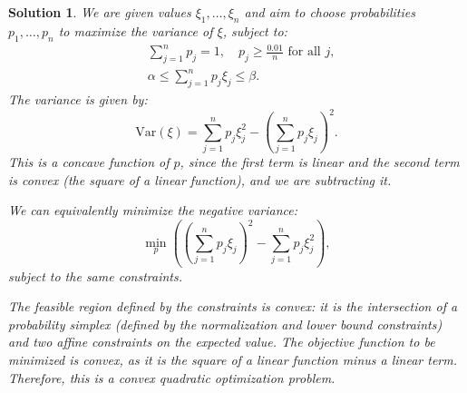 \documentclass[11pt]{article}
\theoremstyle{mystyle}
\newtheorem*{solution}{Solution}
\begin{document}
\begin{solution}
        We are given values \(\xi_1, \ldots, \xi_n\) and aim to choose probabilities \(p_1, \ldots, p_n\) to maximize the variance of \(\xi\), subject to:
        \begin{align*}
        & \sum_{j=1}^n p_j = 1, \quad p_j \geq \frac{0.01}{n} \text{ for all } j, \\
        & \alpha \leq \sum_{j=1}^n p_j \xi_j \leq \beta.
        \end{align*}
        The variance is given by:
        \[
        \text{Var}(\xi) = \sum_{j=1}^n p_j \xi_j^2 - \left( \sum_{j=1}^n p_j \xi_j \right)^2.
        \]
        This is a concave function of \(p\), since the first term is linear and the second term is convex (the square of a linear function), and we are subtracting it.
        
        We can equivalently minimize the negative variance:
        \[
        \min_{p} \left( \left( \sum_{j=1}^n p_j \xi_j \right)^2 - \sum_{j=1}^n p_j \xi_j^2 \right),
        \]
        subject to the same constraints.
        
        The feasible region defined by the constraints is convex: it is the intersection of a probability simplex (defined by the normalization and lower bound constraints) and two affine constraints on the expected value. The objective function to be minimized is convex, as it is the square of a linear function minus a linear term. Therefore, this is a convex quadratic optimization problem.
\end{solution}

    
\end{document}
